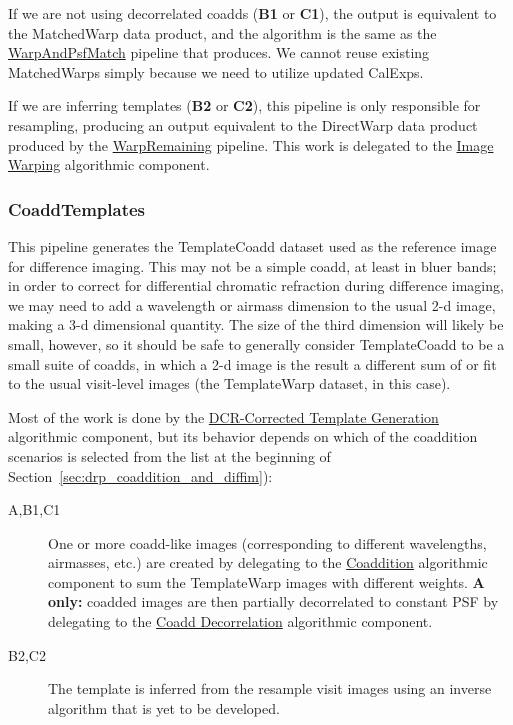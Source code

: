 If we are not using decorrelated coadds (\textbf{B1} or \textbf{C1}), the output is equivalent to the MatchedWarp data product, and the algorithm is the same as the \hyperref[sec:drpWarpAndPsfMatch]{WarpAndPsfMatch} pipeline that produces.  We cannot reuse existing MatchedWarps simply because we need to utilize updated CalExps.

If we are inferring templates (\textbf{B2} or \textbf{C2}), this pipeline is only responsible for resampling, producing an output equivalent to the DirectWarp data product produced by the \hyperref[sec:drpWarpRemaining]{WarpRemaining} pipeline.  This work is delegated to the \hyperref[sec:acWarping]{Image Warping} algorithmic component.

\subsubsection{CoaddTemplates}
\label{sec:drpCoaddTemplates}

This pipeline generates the TemplateCoadd dataset used as the reference image for difference imaging.  This may not be a simple coadd, at least in bluer bands; in order to correct for differential chromatic refraction during difference imaging, we may need to add a wavelength or airmass dimension to the usual 2-d image, making a 3-d dimensional quantity.  The size of the third dimension will likely be small, however, so it should be safe to generally consider TemplateCoadd to be a small suite of coadds, in which a 2-d image is the result a different sum of or fit to the usual visit-level images (the TemplateWarp dataset, in this case).

Most of the work is done by the \hyperref[sec:acDCRTemplates]{DCR-Corrected Template Generation} algorithmic component, but its behavior depends on which of the coaddition scenarios is selected from the list at the beginning of Section~\ref{sec:drp_coaddition_and_diffim}):
\begin{description}
\item[A,B1,C1] One or more coadd-like images (corresponding to different wavelengths, airmasses, etc.) are created by delegating to the \hyperref[sec:acCoaddition]{Coaddition} algorithmic component to sum the TemplateWarp images with different weights.  \textbf{A only:} coadded images are then partially decorrelated to constant PSF by delegating to the \hyperref[sec:acCoaddDecorrelation]{Coadd Decorrelation} algorithmic component.
\item[B2,C2] The template is inferred from the resample visit images using an inverse algorithm that is yet to be developed.
\end{description}

